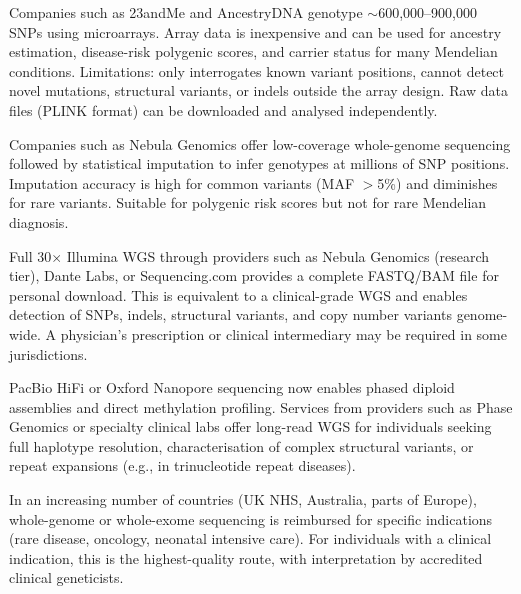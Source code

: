 \begin{description}[style=nextline]
  \item[DTC genotyping arrays (\$50--150)] Companies such as 23andMe and AncestryDNA genotype $\sim$600,000--900,000 SNPs using microarrays. Array data is inexpensive and can be used for ancestry estimation, disease-risk polygenic scores, and carrier status for many Mendelian conditions. Limitations: only interrogates known variant positions, cannot detect novel mutations, structural variants, or indels outside the array design. Raw data files (PLINK format) can be downloaded and analysed independently.

  \item[Low-pass WGS (0.5--1$\times$; \$50--100)] Companies such as Nebula Genomics offer low-coverage whole-genome sequencing followed by statistical imputation to infer genotypes at millions of SNP positions. Imputation accuracy is high for common variants (MAF $>$5\%) and diminishes for rare variants. Suitable for polygenic risk scores but not for rare Mendelian diagnosis.

  \item[30$\times$ short-read WGS (\$200--400)] Full 30$\times$ Illumina WGS through providers such as Nebula Genomics (research tier), Dante Labs, or Sequencing.com provides a complete FASTQ/BAM file for personal download. This is equivalent to a clinical-grade WGS and enables detection of SNPs, indels, structural variants, and copy number variants genome-wide. A physician's prescription or clinical intermediary may be required in some jurisdictions.

  \item[HiFi long-read WGS (\$600--1,200)] PacBio HiFi or Oxford Nanopore sequencing now enables phased diploid assemblies and direct methylation profiling. Services from providers such as Phase Genomics or specialty clinical labs offer long-read WGS for individuals seeking full haplotype resolution, characterisation of complex structural variants, or repeat expansions (e.g., in trinucleotide repeat diseases).

  \item[Clinical WGS via healthcare system] In an increasing number of countries (UK NHS, Australia, parts of Europe), whole-genome or whole-exome sequencing is reimbursed for specific indications (rare disease, oncology, neonatal intensive care). For individuals with a clinical indication, this is the highest-quality route, with interpretation by accredited clinical geneticists.
\end{description}


